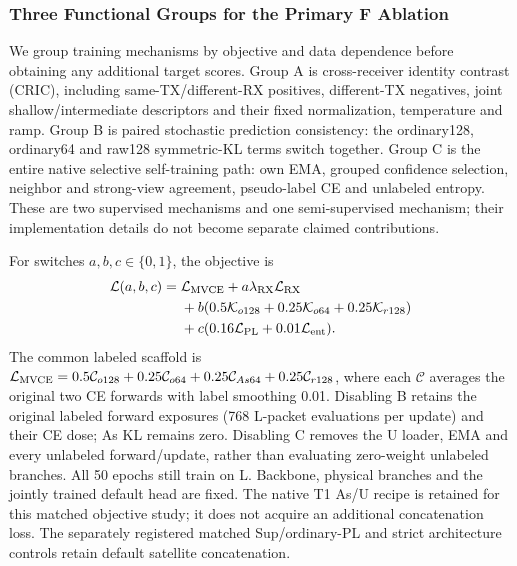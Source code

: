 \subsubsection{Three Functional Groups for the Primary F Ablation}
We group training mechanisms by objective and data dependence before obtaining any additional target scores. Group A is cross-receiver identity contrast (CRIC), including same-TX/different-RX positives, different-TX negatives, joint shallow/intermediate descriptors and their fixed normalization, temperature and ramp. Group B is paired stochastic prediction consistency: the ordinary128, ordinary64 and raw128 symmetric-KL terms switch together. Group C is the entire native selective self-training path: own EMA, grouped confidence selection, neighbor and strong-view agreement, pseudo-label CE and unlabeled entropy. These are two supervised mechanisms and one semi-supervised mechanism; their implementation details do not become separate claimed contributions.

For switches $a,b,c\in\{0,1\}$, the objective is
\begin{equation}
\begin{split}
\mathcal L(a,b,c)={}&\mathcal L_{\rm MVCE}+a\lambda_{\rm RX}\mathcal L_{\rm RX}\\
&+b(0.5\mathcal K_{o128}+0.25\mathcal K_{o64}+0.25\mathcal K_{r128})\\
&+c(0.16\mathcal L_{\rm PL}+0.01\mathcal L_{\rm ent}).
\end{split}
\end{equation}
The common labeled scaffold is $\mathcal L_{\rm MVCE}=0.5\mathcal C_{o128}+0.25\mathcal C_{o64}+0.25\mathcal C_{As64}+0.25\mathcal C_{r128}$, where each $\mathcal C$ averages the original two CE forwards with label smoothing 0.01. Disabling B retains the original labeled forward exposures (768 L-packet evaluations per update) and their CE dose; As KL remains zero. Disabling C removes the U loader, EMA and every unlabeled forward/update, rather than evaluating zero-weight unlabeled branches. All 50 epochs still train on L. Backbone, physical branches and the jointly trained default head are fixed. The native T1 As/U recipe is retained for this matched objective study; it does not acquire an additional concatenation loss. The separately registered matched Sup/ordinary-PL and strict architecture controls retain default satellite concatenation.

